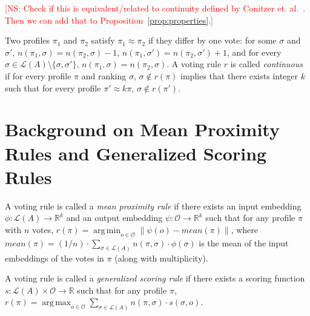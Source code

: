 \documentclass[10pt,letterpaper]{article}
\newcommand{\calL}{{\mathcal{L}}}
\newcommand{\rank}{{\calL(A)}}
\newcommand{\calO}{{\mathcal{O}}}
\DeclareMathOperator*{\argmax}{arg\,max}
\DeclareMathOperator*{\argmin}{arg\,min}
\newenvironment{definition}[1][Definition]{\begin{trivlist}
\item[\hskip \labelsep {\bfseries #1}]}{\end{trivlist}}
\newcommand{\kibitz}[2]{\ifnum\Comments=1\textcolor{#1}{#2}\fi}
\newcommand{\cns}[1]{\kibitz{red} {[NS: #1]}}
\begin{document}

\cns{Check if this is equivalent/related to continuity defined by Conitzer et. al.~\cite{CRX09}. Then we can add that to Proposition~\ref{prop:properties}.}
\begin{definition}[Continuity]
Two profiles $\pi_1$ and $\pi_2$ satisfy $\pi_1 \approx \pi_2$ if they differ by one vote: for some $\sigma$ and $\sigma'$, $n(\pi_1,\sigma) = n(\pi_2,\sigma)-1$, $n(\pi_1,\sigma') = n(\pi_2,\sigma')+1$, and for every $\sigma \in \rank\setminus\{\sigma,\sigma'\}$, $n(\pi_1,\sigma) = n(\pi_2,\sigma)$. A voting rule $r$ is called \emph{continuous} if for every profile $\pi$ and ranking $\sigma$, $\sigma \notin r(\pi)$ implies that there exists integer $k$ such that for every profile $\pi' \approx k \pi$, $\sigma \notin r(\pi')$. 
\end{definition}


\section{Background on Mean Proximity Rules and Generalized Scoring Rules}


\begin{definition}[Mean Proximity Rules (Zwicker~\cite{Zwicker08a})]
A voting rule is called a \emph{mean proximity rule} if there exists an input embedding $\phi : \rank \rightarrow \mathbb{R}^k$ and an output embedding $\psi: \calO \rightarrow \mathbb{R}^k$ such that for any profile $\pi$ with $n$ votes, $r(\pi) = \argmin_{o \in \calO} \|\psi(o) - mean(\pi) \|$, where $mean(\pi) = (1/n) \cdot \sum_{\sigma \in \rank} n(\pi,\sigma) \cdot \phi(\sigma)$ is the mean of the input embeddings of the votes in $\pi$ (along with multiplicity). 
\end{definition}


\begin{definition}[Generalized Scoring Rules (Zwicker~\cite{Zwicker08a})]
A voting rule is called a \emph{generalized scoring rule} if there exists a scoring function $s : \rank \times \calO \rightarrow \mathbb{R}$ such that for any profile $\pi$, $r(\pi) = \argmax_{o \in \calO} \sum_{\sigma \in \rank} n(\pi,\sigma) \cdot s(\sigma,o)$. 
\end{definition}
\end{document}
